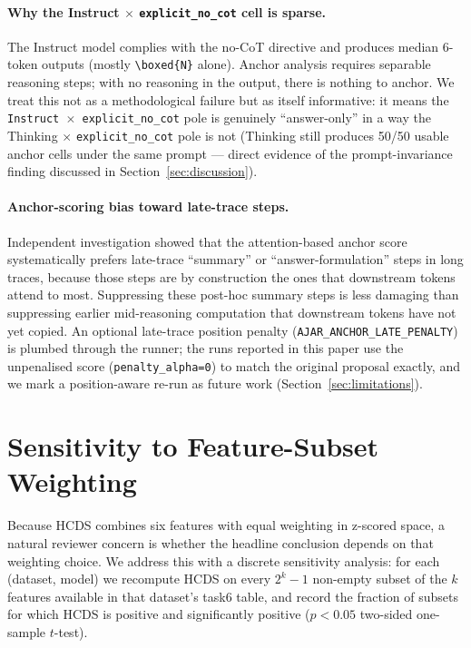 \documentclass{article}
\theoremstyle{plain}
\theoremstyle{definition}
\theoremstyle{remark}
\begin{document}
\paragraph{Why the Instruct $\times$ \texttt{explicit\_no\_cot} cell
is sparse.} The Instruct model complies with the no-CoT directive
and produces median 6-token outputs (mostly \texttt{\textbackslash boxed\{N\}} alone).
Anchor analysis requires separable reasoning steps; with no reasoning
in the output, there is nothing to anchor. We treat this not as a
methodological failure but as itself informative: it means the
\texttt{Instruct $\times$ \texttt{explicit\_no\_cot}} pole is genuinely
``answer-only'' in a way the Thinking $\times$ \texttt{explicit\_no\_cot}
pole is not (Thinking still produces 50/50 usable anchor cells under
the same prompt --- direct evidence of the prompt-invariance finding
discussed in Section~\ref{sec:discussion}).

\paragraph{Anchor-scoring bias toward late-trace steps.}
Independent investigation showed that the attention-based anchor
score systematically prefers late-trace ``summary'' or
``answer-formulation'' steps in long traces, because those steps
are by construction the ones that downstream tokens attend to most.
Suppressing these post-hoc summary steps is less damaging than
suppressing earlier mid-reasoning computation that downstream tokens
have not yet copied. An optional late-trace position penalty
(\texttt{AJAR\_ANCHOR\_LATE\_PENALTY}) is plumbed through the runner;
the runs reported in this paper use the unpenalised score
(\texttt{penalty\_alpha=0}) to match the original proposal exactly,
and we mark a position-aware re-run as future work
(Section~\ref{sec:limitations}).

\section{Sensitivity to Feature-Subset Weighting}
\label{app:sensitivity}

Because HCDS combines six features with equal weighting in z-scored
space, a natural reviewer concern is whether the headline conclusion
depends on that weighting choice. We address this with a discrete
sensitivity analysis: for each (dataset, model) we recompute HCDS
on every $2^k - 1$ non-empty subset of the $k$ features available
in that dataset's task6 table, and record the fraction of subsets
for which HCDS is positive and significantly positive ($p<0.05$
two-sided one-sample $t$-test).
\end{document}
